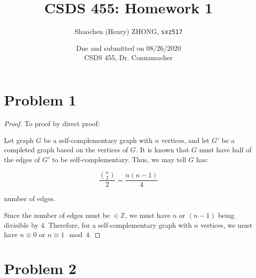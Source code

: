\documentclass[12pt]{article}
\newcommand{\ilc}{\texttt}
\begin{document}
\title{\textbf{CSDS 455: Homework 1}}

\author{Shaochen (Henry) ZHONG, \ilc{sxz517}}
\date{Due and submitted on 08/26/2020 \\ CSDS 455, Dr. Connamacher}
\maketitle

\section{Problem 1}

\begin{proof}
To proof by direct proof:\newline

Let graph $G$ be a self-complementary graph with $n$ vertices, and let $G'$ be a completed graph based on the vertices of $G$. It is known that $G$ must have half of the edges of $G'$ to be self-complementary. Thus, we may tell $G$ has:

\begin{equation}
    \frac{{n \choose 2}}{2} = \frac{n(n-1)}{4} \nonumber
\end{equation}

number of edges.

Since the number of edges must be $\in \mathbb{Z}$, we must have $n$ or $(n-1)$ being divisible by $4$. Therefore, for a self-complementary graph with $n$ vertices, we must have $n \equiv 0$ or $n \equiv 1 \mod 4$.
\end{proof}

\section{Problem 2}
\end{document}
